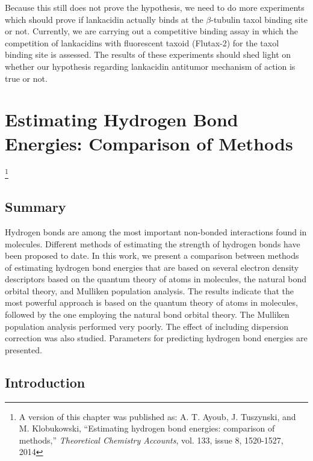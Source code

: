 \documentclass[11pt]{report}
\begin{document}
Because this  still does not prove the hypothesis, we need to do more experiments
which should prove if lankacidin actually binds at the $\beta$-tubulin
taxol binding site or not. Currently, we are carrying out a competitive
binding assay in which the competition of lankacidins with fluorescent 
taxoid (Flutax-2) for the taxol binding site is assessed. The
results of these
experiments should shed light on whether our hypothesis 
regarding lankacidin antitumor 
mechanism of action is true or not.


\chapter{Estimating Hydrogen Bond Energies: Comparison of Methods}
\label{HB}

\footnote{A version of this chapter
was published as: A. T. Ayoub, J. Tuszynski, and M. Klobukowski, ``Estimating hydrogen bond energies: comparison of methods,'' 
\emph{Theoretical Chemistry Accounts}, vol. 133, issue 8,
1520-1527, 2014} 

\section{Summary}
Hydrogen bonds are among the most important non-bonded interactions found in molecules. Different methods of estimating the strength of hydrogen bonds have been proposed to date. In this work, we present a comparison between methods of estimating hydrogen bond energies that are based on several electron density descriptors based on the quantum theory of atoms in molecules, the natural bond orbital theory, and Mulliken population analysis. The results indicate that the most powerful approach is based on the quantum theory of atoms in molecules, followed by the one employing the natural bond orbital theory. The Mulliken population analysis performed very poorly. The effect of including dispersion correction was also studied. Parameters for predicting hydrogen bond energies are presented.

\section{Introduction}
\label{s:HBP-Intro}
\end{document}

